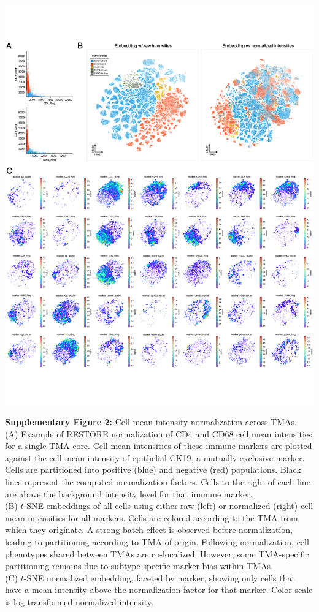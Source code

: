\documentclass[preprint,review,3p,12pt]{elsarticle}
\begin{document}
\begin{suppfigure}[p]
\centering\includegraphics[width=\linewidth,
                 keepaspectratio]{suppfig2_secondrevision}
\caption{}
\label{fig:suppfig2}
\end{suppfigure}

\newpage

\noindent
\textbf{Supplementary Figure 2:} Cell mean intensity normalization across TMAs.\\
(A) Example of RESTORE normalization \cite{Chang2020} of CD4 and CD68 cell mean intensities for a single TMA core. Cell mean intensities of these immune markers are plotted against the cell mean intensity of epithelial CK19, a mutually exclusive marker. Cells are partitioned into positive (blue) and negative (red) populations. Black lines represent the computed normalization factors. Cells to the right of each line are above the background intensity level for that immune marker.\\
(B) $t$-SNE embeddings of all cells using either raw (left) or normalized (right) cell mean intensities for all markers. Cells are colored according to the TMA from which they originate. A strong batch effect is observed before normalization, leading to partitioning according to TMA of origin. Following normalization, cell phenotypes shared between TMAs are co-localized. However, some TMA-specific partitioning remains due to subtype-specific marker bias within TMAs.\\
(C) $t$-SNE normalized embedding, faceted by marker, showing only cells that have a mean intensity above the normalization factor for that marker. Color scale is log-transformed normalized intensity.
\end{document}
